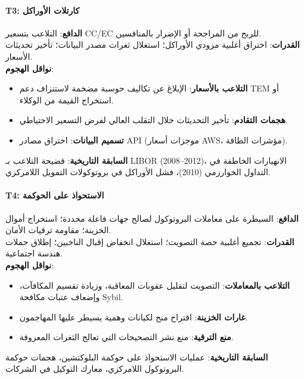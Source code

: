 \documentclass[11pt]{article}
\begin{document}
\paragraph{T3: كارتلات الأوراكل}
\textbf{الدافع}: التلاعب بتسعير CC/EC للربح من المراجحة أو الإضرار بالمنافسين.\\
\textbf{القدرات}: اختراق أغلبية مزودي الأوراكل؛ استغلال ثغرات مصدر البيانات؛ تأخير تحديثات الأسعار.\\
\textbf{نواقل الهجوم}:
\begin{itemize}[noitemsep]
  \item \textbf{التلاعب بالأسعار}: الإبلاغ عن تكاليف حوسبة مضخمة لاستنزاف دعم TEM أو استخراج القيمة من الوكلاء.
  \item \textbf{هجمات التقادم}: تأخير التحديثات خلال التقلب العالي لفرض التسعير الاحتياطي.
  \item \textbf{تسميم البيانات}: اختراق مصادر API (موجزات أسعار AWS، مؤشرات الطاقة).
\end{itemize}
\textbf{السابقة التاريخية}: فضيحة التلاعب بـ LIBOR (2008--2012)، الانهيارات الخاطفة في التداول الخوارزمي (2010)، فشل الأوراكل في بروتوكولات التمويل اللامركزي.

\paragraph{T4: الاستحواذ على الحوكمة}
\textbf{الدافع}: السيطرة على معاملات البروتوكول لصالح جهات فاعلة محددة؛ استخراج أموال الخزينة؛ مقاومة ترقيات الأمان.\\
\textbf{القدرات}: تجميع أغلبية حصة التصويت؛ استغلال انخفاض إقبال الناخبين؛ إطلاق حملات هندسة اجتماعية.\\
\textbf{نواقل الهجوم}:
\begin{itemize}[noitemsep]
  \item \textbf{التلاعب بالمعاملات}: التصويت لتقليل عقوبات المعاقبة، وزيادة تقسيم المكافآت، وإضعاف عتبات مكافحة Sybil.
  \item \textbf{غارات الخزينة}: اقتراح منح لكيانات وهمية يسيطر عليها المهاجمون.
  \item \textbf{منع الترقية}: منع نشر التصحيحات التي تعالج الثغرات المعروفة.
\end{itemize}
\textbf{السابقة التاريخية}: عمليات الاستحواذ على حوكمة البلوكتشين، هجمات حوكمة البروتوكول اللامركزي، معارك التوكيل في الشركات.
\end{document}
